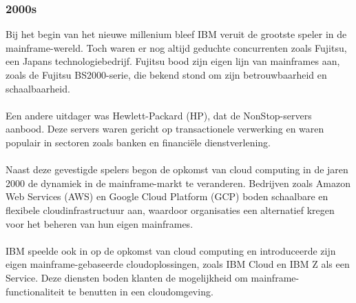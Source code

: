 \subsubsection{2000s}
\label{sec:2000s}
Bij het begin van het nieuwe millenium bleef IBM veruit de grootste speler in de mainframe-wereld. Toch waren er nog altijd geduchte concurrenten zoals Fujitsu, een Japans technologiebedrijf. Fujitsu bood zijn eigen lijn van mainframes aan, zoals de Fujitsu BS2000-serie, die bekend stond om zijn betrouwbaarheid en schaalbaarheid. \autocite{Lamonica2004}
\\ \\
Een andere uitdager was Hewlett-Packard (HP), dat de NonStop-servers aanbood. Deze servers waren gericht op transactionele verwerking en waren populair in sectoren zoals banken en financiële dienstverlening. \autocite{Lamonica2004}
\\ \\
Naast deze gevestigde spelers begon de opkomst van cloud computing in de jaren 2000 de dynamiek in de mainframe-markt te veranderen. Bedrijven zoals Amazon Web Services (AWS) en Google Cloud Platform (GCP) boden schaalbare en flexibele cloudinfrastructuur aan, waardoor organisaties een alternatief kregen voor het beheren van hun eigen mainframes. \autocite{AWS} \autocite{Google}
\\ \\
IBM speelde ook in op de opkomst van cloud computing en introduceerde zijn eigen mainframe-gebaseerde cloudoplossingen, zoals IBM Cloud en IBM Z als een Service. Deze diensten boden klanten de mogelijkheid om mainframe-functionaliteit te benutten in een cloudomgeving. \autocite{IBM2020}
\\ \\
